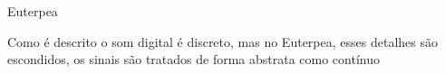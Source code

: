 Euterpea 

Como é descrito o som digital é discreto, mas no Euterpea, esses detalhes são escondidos, os sinais são tratados de forma abstrata como contínuo